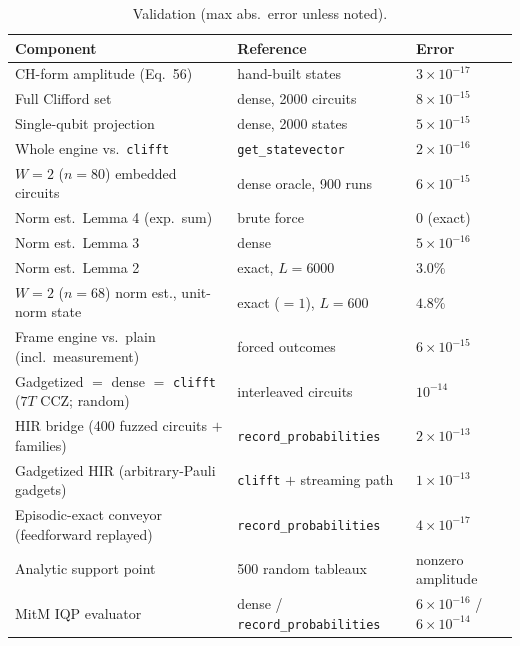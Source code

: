 \documentclass[11pt]{article}
\begin{document}
\begin{table}[h]\centering
\caption{Validation (max abs.\ error unless noted).}\label{tab:valid}
\begin{tabular}{lll}
\toprule
Component & Reference & Error \\
\midrule
CH-form amplitude (Eq.~56) & hand-built states & $3\times10^{-17}$ \\
Full Clifford set & dense, 2000 circuits & $8\times10^{-15}$ \\
Single-qubit projection & dense, 2000 states & $5\times10^{-15}$ \\
Whole engine vs.\ \texttt{clifft} & \texttt{get\_statevector} & $2\times10^{-16}$ \\
$W{=}2$ ($n{=}80$) embedded circuits & dense oracle, 900 runs & $6\times10^{-15}$ \\
Norm est.\ Lemma 4 (exp.\ sum) & brute force & $0$ (exact) \\
Norm est.\ Lemma 3 & dense & $5\times10^{-16}$ \\
Norm est.\ Lemma 2 & exact, $L{=}6000$ & $3.0\%$ \\
$W{=}2$ ($n{=}68$) norm est., unit-norm state & exact ($=\!1$), $L{=}600$ & $4.8\%$ \\
Frame engine vs.\ plain (incl.\ measurement) & forced outcomes & $6\times10^{-15}$ \\
Gadgetized $=$ dense $=$ \texttt{clifft} ($7T$ CCZ; random) & interleaved circuits & $10^{-14}$ \\
HIR bridge (400 fuzzed circuits $+$ families) & \texttt{record\_probabilities} & $2\times10^{-13}$ \\
Gadgetized HIR (arbitrary-Pauli gadgets) & \texttt{clifft} $+$ streaming path & $1\times10^{-13}$ \\
Episodic-exact conveyor (feedforward replayed) & \texttt{record\_probabilities} & $4\times10^{-17}$ \\
Analytic support point & 500 random tableaux & nonzero amplitude \\
MitM IQP evaluator & dense / \texttt{record\_probabilities} & $6\times10^{-16}$ / $6\times10^{-14}$ \\
\bottomrule
\end{tabular}
\end{table}
\end{document}
